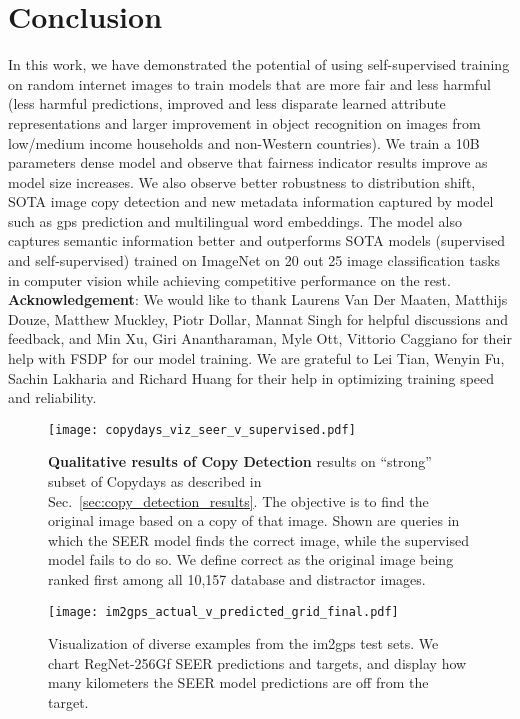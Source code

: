 \documentclass[10pt,twocolumn,letterpaper]{article}
\begin{document}
\section{Conclusion}
In this work, we have demonstrated the potential of using self-supervised training on random internet images to train models that are more fair and less harmful (less harmful predictions, improved and less disparate learned attribute representations and larger improvement in object recognition on images from low/medium income households and non-Western countries). We train a 10B parameters dense model and observe that fairness indicator results improve as model size increases. We also observe better robustness to distribution shift, SOTA image copy detection and new metadata information captured by model such as gps prediction and multilingual word embeddings. The model also captures semantic information better and outperforms SOTA models (supervised and self-supervised) trained on ImageNet on 20 out 25 image classification tasks in computer vision while achieving competitive performance on the rest. \\


{\small{\noindent\textbf{Acknowledgement}:
We would like to thank Laurens Van Der Maaten, Matthijs Douze, Matthew Muckley, Piotr Dollar, Mannat Singh for helpful discussions and feedback, and Min Xu, Giri Anantharaman, Myle Ott, Vittorio Caggiano for their help with FSDP for our model training. We are grateful to Lei Tian, Wenyin Fu, Sachin Lakharia and Richard Huang for their help in optimizing training speed and reliability.}} 



\begin{figure}[t]
    \centering
    \texttt{[image: copydays\_viz\_seer\_v\_supervised.pdf]}
    \caption{
    \textbf{Qualitative results of Copy Detection} results on ``strong'' subset of Copydays as described in Sec.~\ref{sec:copy_detection_results}. The objective is to find the original image based on a copy of that image. Shown are queries in which the SEER model finds the correct image, while the supervised model fails to do so. We define correct as the original image being ranked first among all 10,157 database and distractor images.
    }
    \label{fig:copydays_viz_seer_v_supervised_appendix} 
\end{figure}


\begin{figure*}[t]
  \centering
  \texttt{[image: im2gps\_actual\_v\_predicted\_grid\_final.pdf]}
  \caption{
        Visualization of diverse examples from the im2gps test sets. We chart RegNet-256Gf SEER predictions and targets, and display how many kilometers the SEER model predictions are off from the target.
  }
  \label{fig:im2gps_actual_v_predicted_grid}
\end{figure*}
\end{document}
